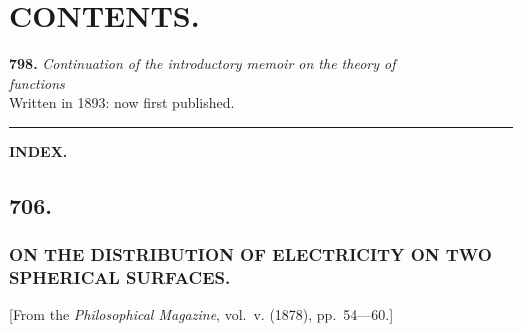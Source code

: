 \documentclass[12pt,a4paper,oneside]{book}
\theoremstyle{plain}
\theoremstyle{definition}
\theoremstyle{remark}
\begin{document}
\cleardoublepage

\chapter*{CONTENTS.}

\textbf{798.} \textit{Continuation of the introductory memoir on the theory of}\\
\hspace*{2em}\textit{functions} \\
\hspace*{2em}Written in 1893: now first published.

\vspace{2em}
\begin{center}
\rule{0.5\textwidth}{0.4pt}
\end{center}

\textbf{INDEX.} 

\cleardoublepage

\thispagestyle{empty}
\vspace*{\fill}
\cleardoublepage

\mainmatter

\section*{706.}
\subsection*{ON THE DISTRIBUTION OF ELECTRICITY ON TWO SPHERICAL SURFACES.}

\begin{center}
[From the \textit{Philosophical Magazine}, vol.~v. (1878), pp.~54---60.]
\end{center}
\medskip
\end{document}
